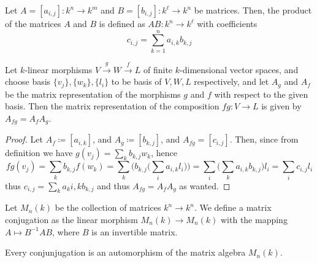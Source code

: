 \begin{definition}\label{def: matrix multiplication}
  Let \(A = [a_{i,j}] : k^n \to k^m\) and \(B = [b_{i, j}] : k^\ell \to k^n\) be
  matrices. Then, the product of the matrices \(A\) and \(B\) is defined as
  \(AB : k^n \to k^\ell\) with coefficients
  \[
    c_{i, j} = \sum_{k=1}^n a_{i, k} b_{k, j}
  \]
\end{definition}

\begin{proposition}
  \label{prop: matrix of the composition}
  Let \(k\)-linear morphisms \(V \xrightarrow g W \xrightarrow f L\) of finite
  \(k\)-dimensional vector spaces, and choose basis \(\{v_j\}, \{w_k\}, \{l_i\}\)
  to be basis of \(V, W, L\) respectively, and let \(A_g\) and \(A_f\) be the
  matrix representation of the morphisms \(g\) and \(f\) with respect to the
  given basis. Then the matrix representation of the composition \(f  g: V
  \to L\) is given by \(A_{f  g} = A_f A_g\).
\end{proposition}

\begin{proof}
  Let \(A_f \coloneq [a_{i, k}]\), and \(A_g \coloneq [b_{k, j}]\), and \(A_{f  g} =
  [c_{i, j}]\). Then, since from definition we have \(g(v_j) = \sum_k b_{k, j}
  w_k\), hence
  \[
    f  g(v_j) =
    \sum_k b_{k, j} f(w_k) =
    \sum_k \bigg( b_{k, j} \bigg( \sum_i a_{i, k} l_i \bigg) \bigg)
    = \sum_i \bigg( \sum_k a_{i, k} b_{k, j} \bigg) l_i
    = \sum_i c_{i, j} l_i
  \]
  thus \(c_{i, j} = \sum_k a_k{i, k} b_{k, j}\) and thus \(A_{f  g} = A_f
  A_g\) as wanted.
\end{proof}

\begin{definition}[Conjugation]\label{def: matrix conjugation}
  Let \(M_n(k)\) be the collection of matrices \(k^n \to k^n\). We define a
  matrix conjugation as the linear morphism \(M_n(k) \to M_n(k)\) with the
  mapping \(A \mapsto B^{-1} A B\), where \(B\) is an invertible matrix.
\end{definition}

\begin{proposition}
  Every conjunjugation is an automorphism of the matrix algebra \(M_n(k)\).
\end{proposition}
